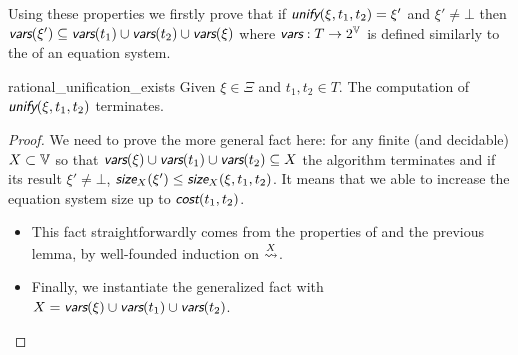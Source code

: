 Using these properties we firstly prove that if $\unify(\xi, t_1, t_2) = \xi'$ and $\xi' \neq \bot$ then $\vars(\xi') \subseteq \vars(t_1) \cup \vars(t_2) \cup \vars(\xi)$ where $\vars : T \rightarrow 2^\V$ \space{} is defined similarly to the \vars of an equation system.

\begin{rocqtheorem}{rational_unification_exists}
    Given $\xi \in \Xi$ and $t_1, t_2 \in T$. The computation of $\unify(\xi, t_1, t_2)$ terminates.
\end{rocqtheorem}
\begin{proof}
    We need to prove the more general fact here: for any finite (and decidable) $X \subset \mathbb{V}$ so that $\vars(\xi) \cup \vars(t_1) \cup \vars(t_2) \subseteq X$ the algorithm terminates and if its result $\xi' \neq \bot$, $\size_X(\xi') \le \size_X(\xi, t_1, t_2)$. It means that we able to increase the equation system size up to $\cost(t_1, t_2)$.
    \begin{itemize}
        \item This fact straightforwardly comes from the properties of \union and the previous lemma, by well-founded induction on $\mathrel{\overset{X}{\rightsquigarrow}}$.
        \item Finally, we instantiate the generalized fact with $X = \vars(\xi) \cup \vars(t_1) \cup \vars(t_2)$.
    \end{itemize}
\end{proof}
